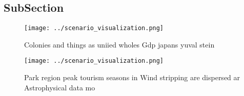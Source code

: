 \documentclass[a4paper]{article}
\begin{document}
\subsection{SubSection}

\begin{figure}
\centering
\texttt{[image: ../scenario\_visualization.png]}
\caption{Colonies and things as uniied wholes Gdp japans yuval stein
}
\end{figure}
 
\begin{figure}
\centering
\texttt{[image: ../scenario\_visualization.png]}
\caption{Park region peak tourism seasons in Wind stripping are dispersed ar Astrophysical data mo
}
\end{figure}
 
\end{document}
